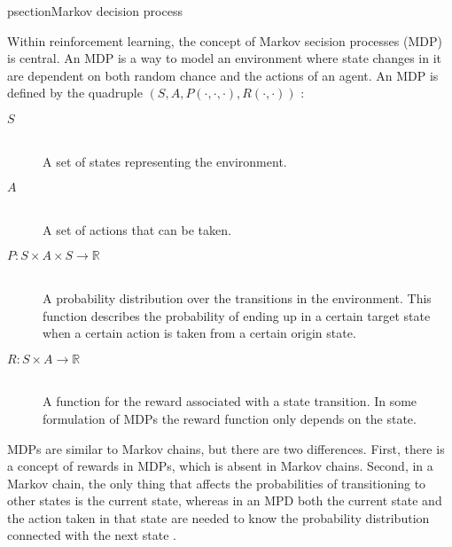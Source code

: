 psection{Markov decision process}

Within reinforcement learning, the concept of Markov secision processes (MDP) is central. An MDP is a way to model an environment where state changes in it are dependent on both random chance and the actions of an agent. An MDP is defined by the quadruple $\left( S, A, P( \cdot , \cdot, \cdot ) , R( \cdot , \cdot ) \right)$ \parencite{altman2002applications}: 

\begin{description}
\item[$S$] \hfill \\ 
    A set of states representing the environment.
\item[$A$] \hfill \\ 
    A set of actions that can be taken.
\item[$P \colon S \times A \times S \to \mathbb R$] \hfill \\ 
    A probability distribution over the transitions in the environment. This function describes the probability of ending up in a certain target state when a certain action is taken from a certain origin state. 
\item[$R \colon S \times A \to \mathbb{R}$] \hfill \\ 
    A function for the reward associated with a state transition. In some formulation of MDPs the reward function only depends on the state.
\end{description}

MDPs are similar to Markov chains, but there are two differences. First, there is a concept of rewards in MDPs, which is absent in Markov chains. Second, in a Markov chain, the only thing that affects the probabilities of transitioning to other states is the current state, whereas in an MPD both the current state and the action taken in that state are needed to know the probability distribution connected with the next state \parencite{altman2002applications}.





